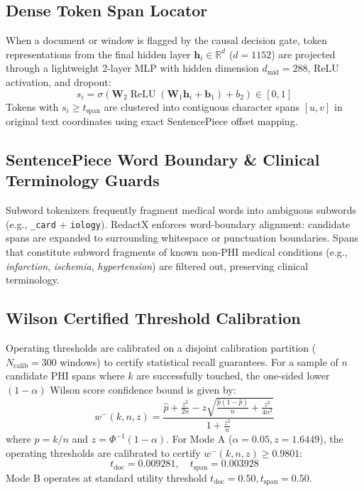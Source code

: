 \documentclass[11pt,a4paper]{article}
\begin{document}
\subsection{Dense Token Span Locator}
When a document or window is flagged by the causal decision gate, token representations from the final hidden layer $\mathbf{h}_i \in \mathbb{R}^{d}$ ($d=1152$) are projected through a lightweight 2-layer MLP with hidden dimension $d_{\text{mid}}=288$, ReLU activation, and dropout:
\begin{equation}
    s_i = \sigma\left(\mathbf{W}_2 \operatorname{ReLU}(\mathbf{W}_1 \mathbf{h}_i + \mathbf{b}_1) + b_2\right) \in [0, 1]
\end{equation}
Tokens with $s_i \ge t_{\text{span}}$ are clustered into contiguous character spans $[u, v]$ in original text coordinates using exact SentencePiece offset mapping.

\subsection{SentencePiece Word Boundary & Clinical Terminology Guards}
Subword tokenizers frequently fragment medical words into ambiguous subwords (e.g., \texttt{\_card} + \texttt{iology}). RedactX enforces word-boundary alignment: candidate spans are expanded to surrounding whitespace or punctuation boundaries. Spans that constitute subword fragments of known non-PHI medical conditions (e.g., \textit{infarction}, \textit{ischemia}, \textit{hypertension}) are filtered out, preserving clinical terminology.

\subsection{Wilson Certified Threshold Calibration}
Operating thresholds are calibrated on a disjoint calibration partition ($N_{\text{calib}}=300$ windows) to certify statistical recall guarantees. For a sample of $n$ candidate PHI spans where $k$ are successfully touched, the one-sided lower $(1-\alpha)$ Wilson score confidence bound is given by:
\begin{equation}
    w^-(k, n, z) = \frac{\hat{p} + \frac{z^2}{2n} - z \sqrt{\frac{\hat{p}(1-\hat{p})}{n} + \frac{z^2}{4n^2}}}{1 + \frac{z^2}{n}}
\end{equation}
where $\hat{p} = k/n$ and $z = \Phi^{-1}(1-\alpha)$. For Mode A ($\alpha=0.05, z=1.6449$), the operating thresholds are calibrated to certify $w^-(k, n, z) \ge 0.9801$:
\begin{equation}
    t_{\text{doc}} = 0.009281, \quad t_{\text{span}} = 0.003928
\end{equation}
Mode B operates at standard utility threshold $t_{\text{doc}} = 0.50, t_{\text{span}} = 0.50$.
\end{document}
